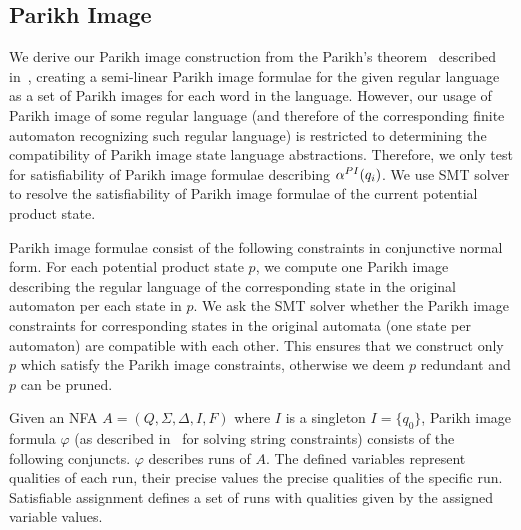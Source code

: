 \subsection{Parikh Image} \label{sec:parikhImage}

We derive our Parikh image construction from the Parikh's theorem~\cite{Kozen1977} described in~\cite{ParikhsTheoremSimpleAndDirectConstruction}, creating a semi-linear Parikh image formulae for the given regular language as a set of Parikh images for each word in the language. However, our usage of Parikh image of some regular language (and therefore of the corresponding finite automaton recognizing such regular language) is restricted to determining the compatibility of Parikh image state language abstractions. Therefore, we only test for satisfiability of Parikh image formulae describing $\alpha^{PI}(q_i)$. We use SMT solver to resolve the satisfiability of Parikh image formulae of the current potential product state.

Parikh image formulae consist of the following constraints in conjunctive normal form. For each potential product state $p$, we compute one Parikh image describing the regular language of the corresponding state in the original automaton per each state in $p$. We ask the SMT solver whether the Parikh image constraints for corresponding states in the original automata (one state per automaton) are compatible with each other. This ensures that we construct only $p$ which satisfy the Parikh image constraints, otherwise we deem $p$ redundant and $p$ can be pruned.

Given an NFA $A = (Q, \Sigma, \Delta, I, F)$ where $I$ is a singleton $I = \{ q_{0} \}$, Parikh image formula $\varphi$ (as described in~\cite{PI_computation/10.1007/978-3-030-45093-9_59} for solving string constraints) consists of the following conjuncts. $\varphi$ describes runs of $A$. The defined variables represent qualities of each run, their precise values the precise qualities of the specific run. Satisfiable assignment defines a set of runs with qualities given by the assigned variable values.


